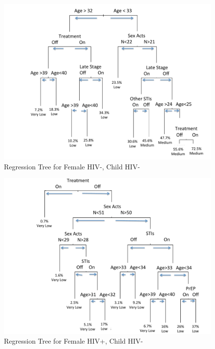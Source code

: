 \documentclass[11pt]{nih_mod}
\begin{document}
\begin{figure}[!h]
  \begin{center}
    \includegraphics[width=7in]{figures/Tree_Outcome1_09Sept2012.pdf}
  \end{center}
  \caption{Regression Tree for Female HIV-, Child HIV-}
  \label{Fig:TreeOutcome1}
\end{figure}

\begin{figure}[!h]
  \begin{center}
    \includegraphics[width=7in]{figures/Tree_Outcome2_09Sept2012.pdf}
  \end{center}
  \caption{Regression Tree for Female HIV+, Child HIV-}
  \label{Fig:TreeOutcome2}
\end{figure}
\end{document}
